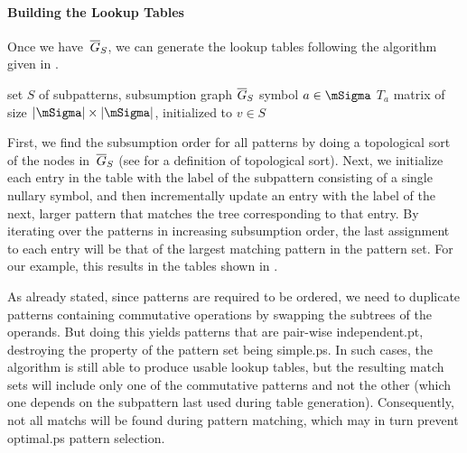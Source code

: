 \paragraph{Building the Lookup Tables}

Once we have~$\overline{G}_S$, we can generate the lookup tables following the algorithm
given in .
%
\begin{algorithm}[t]
               {%
                 set $S$ of subpatterns,
                 subsumption graph $\overline{G}_S$
                 symbol $a \in \mSigma$%
               }%
  {%
    $T_a$ \Assign matrix of size $|\mSigma| \times |\mSigma|$,
                  initialized to $v \in S$\;
  }

  \caption[%
            Algorithm for generating the lookup tables used in
            Hoffmann-O'Donnell%
          ]%
          {%
            Algorithm for generating the lookup
            tables~\cite{HoffmannODonnell:1982}%
          }
\end{algorithm}
%
First, we find the \gls{subsumption order} for all \glspl{pattern} by doing a
\gls{topological sort} of the \glspl{node} in~$\overline{G}_S$ (see
 for a definition of \gls{topological sort}).
%
Next, we initialize each entry in the table with the label of the
\gls{subpattern} consisting of a single \gls{nullary symbol}, and then
incrementally update an entry with the label of the next, larger \gls{pattern}
that matches the \gls{tree} corresponding to that entry.
%
By iterating over the \glspl{pattern} in increasing \gls{subsumption order}, the
last assignment to each entry will be that of the largest matching \gls{pattern}
in the \gls{pattern set}.
%
For our example, this results in the tables shown in
.

As already stated, since \glspl{pattern} are required to be ordered, we need to
duplicate \glspl{pattern} containing commutative operations by swapping the
\glspl{subtree} of the operands.
%
But doing this yields \glspl{pattern} that are pair-wise \gls{independent.pt},
destroying the property of the \gls{pattern set} being \gls{simple.ps}.
%
In such cases, the algorithm is still able to produce usable lookup tables, but
the resulting match sets will include only one of the commutative
\glspl{pattern} and not the other (which one depends on the \gls{subpattern}
last used during table generation).
%
Consequently, not all \glspl{match} will be found during \gls{pattern matching},
which may in turn prevent \gls{optimal.ps} \gls{pattern selection}.


